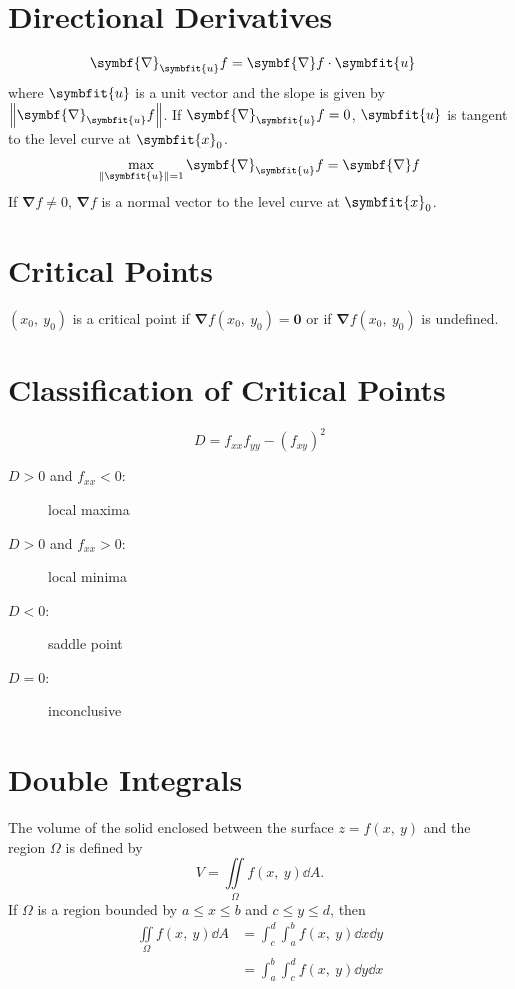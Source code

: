 \documentclass{article}
\begin{document}
\begin{multicols}{3}
    \section*{Directional Derivatives}
    \begin{align*}
        \symbf{\nabla}_{\symbfit{u}}f
         & = \symbf{\nabla}f \cdot \symbfit{u}
    \end{align*}
    where \(\symbfit{u}\) is a unit vector and the slope is given by \(\norm{\symbf{\nabla}_{\symbfit{u}}f}\).
    If \(\symbf{\nabla}_{\symbfit{u}}f=0\), \(\symbfit{u}\) is tangent to the level curve at \(\symbfit{x}_0\).
    \begin{align*}
        \max_{\norm{\symbfit{u}} = 1} \symbf{\nabla}_{\symbfit{u}}f = \symbf{\nabla}f
    \end{align*}
    If \(\symbf{\nabla}f\neq 0\), \(\symbf{\nabla}f\) is a normal vector to the level curve at \(\symbfit{x}_0\).
    \section*{Critical Points}
    \((x_0,\: y_0)\) is a critical point if \(\symbf{\nabla}f(x_0,\: y_0) = \symbf{0}\)
    or if \(\symbf{\nabla}f(x_0,\: y_0)\) is undefined.
    \section*{Classification of Critical Points}
    \begin{equation*}
        D = f_{xx}f_{yy} - \left( f_{xy} \right)^2
    \end{equation*}
    \begin{description}
        \item[\(D > 0\) and \(f_{xx} < 0\):] local maxima
        \item[\(D > 0\) and \(f_{xx} > 0\):] local minima
        \item[\(D < 0\):] saddle point
        \item[\(D = 0\):] inconclusive
    \end{description}
    \section*{Double Integrals}
    The volume of the solid
    enclosed between the surface \(z=f(x,\: y)\) and the region \(\Omega\) is
    defined by
    \begin{equation*}
        V = \iint\limits_{\Omega} f(x,\: y) \dd{A}.
    \end{equation*}
    If \(\Omega\) is a region bounded by \(a \leq x \leq b\) and \(c \leq y \leq d\), then
    \begin{align*}
        \iint\limits_{\Omega} f(x,\: y) \dd{A} & = \int_c^d\int_a^b f(x,\: y) \dd{x} \dd{y} \\
                                               & = \int_a^b\int_c^d f(x,\: y) \dd{y} \dd{x}
    \end{align*}

\end{multicols}
\end{document}
